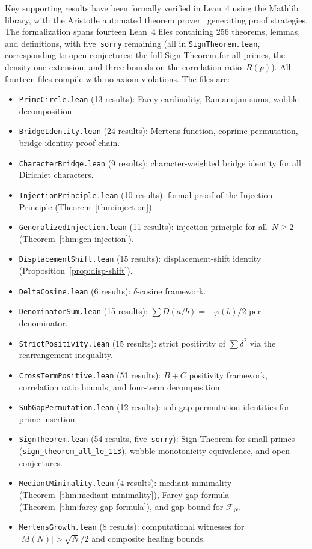 \documentclass[11pt]{article}
\theoremstyle{definition}
\newcommand{\F}{\mathcal{F}}
\begin{document}
Key supporting results have been formally verified in Lean~4
using the Mathlib library, with the Aristotle automated theorem
prover~\cite{Aristotle2025} generating proof strategies.
The formalization spans fourteen Lean~4 files containing 256
theorems, lemmas, and definitions, with
five~\texttt{sorry} remaining (all in \texttt{SignTheorem.lean},
corresponding to open conjectures: the full Sign Theorem for
all primes, the density-one extension, and three bounds on
the correlation ratio~$R(p)$).
All fourteen files compile with no axiom
violations.  The files are:
\begin{itemize}
  \item \texttt{PrimeCircle.lean} (13 results): Farey cardinality,
    Ramanujan sums, wobble decomposition.
  \item \texttt{BridgeIdentity.lean} (24 results): Mertens function,
    coprime permutation, bridge identity proof chain.
  \item \texttt{CharacterBridge.lean} (9 results): character-weighted
    bridge identity for all Dirichlet characters.
  \item \texttt{InjectionPrinciple.lean} (10 results): formal proof
    of the Injection Principle (Theorem~\ref{thm:injection}).
  \item \texttt{GeneralizedInjection.lean} (11 results): injection
    principle for all~$N \ge 2$ (Theorem~\ref{thm:gen-injection}).
  \item \texttt{DisplacementShift.lean} (15 results):
    displacement-shift identity
    (Proposition~\ref{prop:disp-shift}).
  \item \texttt{DeltaCosine.lean} (6 results):
    $\delta$-cosine framework.
  \item \texttt{DenominatorSum.lean} (15 results):
    $\sum D(a/b) = -\varphi(b)/2$ per denominator.
  \item \texttt{StrictPositivity.lean} (15 results):
    strict positivity of $\sum \delta^2$
    via the rearrangement inequality.
  \item \texttt{CrossTermPositive.lean} (51 results):
    $B + C$ positivity framework, correlation ratio bounds,
    and four-term decomposition.
  \item \texttt{SubGapPermutation.lean} (12 results):
    sub-gap permutation identities for prime insertion.
  \item \texttt{SignTheorem.lean} (54 results,
    five~\texttt{sorry}): Sign Theorem for small primes
    (\texttt{sign\_theorem\_all\_le\_113}), wobble
    monotonicity equivalence, and open conjectures.
  \item \texttt{MediantMinimality.lean} (4 results):
    mediant minimality (Theorem~\ref{thm:mediant-minimality}),
    Farey gap formula (Theorem~\ref{thm:farey-gap-formula}),
    and gap bound for $\F_N$.
  \item \texttt{MertensGrowth.lean} (8 results):
    computational witnesses for $|M(N)| > \sqrt{N}/2$
    and composite healing bounds.
\end{itemize}
\end{document}
